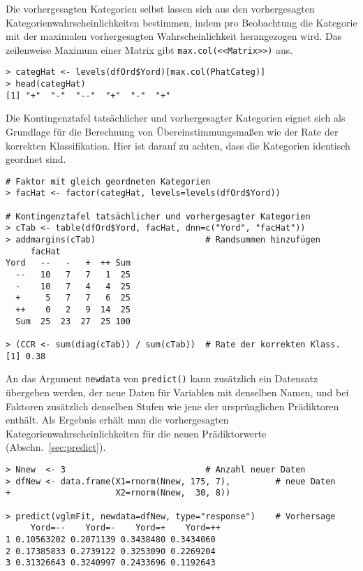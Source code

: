 Die vorhergesagten Kategorien selbst lassen sich aus den vorhergesagten Kategorienwahrscheinlichkeiten bestimmen, indem pro Beobachtung die Kategorie mit der maximalen vorhergesagten Wahrscheinlichkeit herangezogen wird. Das zeilenweise Maximum einer Matrix gibt \lstinline!max.col(<<Matrix>>)! aus.
\begin{lstlisting}
> categHat <- levels(dfOrd$Yord)[max.col(PhatCateg)]
> head(categHat)
[1] "+"  "-"  "--"  "+"  "-"  "+"
\end{lstlisting}

Die Kontingenztafel tatsächlicher und vorhergesagter Kategorien eignet sich als Grundlage für die Berechnung von Übereinstimmungsmaßen wie der Rate der korrekten Klassifikation. Hier ist darauf zu achten, dass die Kategorien identisch geordnet sind.
\begin{lstlisting}
# Faktor mit gleich geordneten Kategorien
> facHat <- factor(categHat, levels=levels(dfOrd$Yord))

# Kontingenztafel tatsächlicher und vorhergesagter Kategorien
> cTab <- table(dfOrd$Yord, facHat, dnn=c("Yord", "facHat"))
> addmargins(cTab)                      # Randsummen hinzufügen
     facHat
Yord   --   -   +  ++ Sum
  --   10   7   7   1  25
  -    10   7   4   4  25
  +     5   7   7   6  25
  ++    0   2   9  14  25
  Sum  25  23  27  25 100

> (CCR <- sum(diag(cTab)) / sum(cTab))  # Rate der korrekten Klass.
[1] 0.38
\end{lstlisting}

An das Argument \lstinline!newdata! von \lstinline!predict()! kann zusätzlich ein Datensatz übergeben werden, der neue Daten für Variablen mit denselben Namen, und bei Faktoren zusätzlich denselben Stufen wie jene der ursprünglichen Prädiktoren enthält. Als Ergebnis erhält man die vorhergesagten Kategorienwahrscheinlichkeiten für die neuen Prädiktorwerte (Abschn.\ \ref{sec:predict}).
\begin{lstlisting}
> Nnew  <- 3                            # Anzahl neuer Daten
> dfNew <- data.frame(X1=rnorm(Nnew, 175, 7),         # neue Daten
+                     X2=rnorm(Nnew,  30, 8))

> predict(vglmFit, newdata=dfNew, type="response")    # Vorhersage
     Yord=--    Yord=-    Yord=+    Yord=++
1 0.10563202 0.2071139 0.3438480 0.3434060
2 0.17385833 0.2739122 0.3253090 0.2269204
3 0.31326643 0.3240997 0.2433696 0.1192643
\end{lstlisting}

